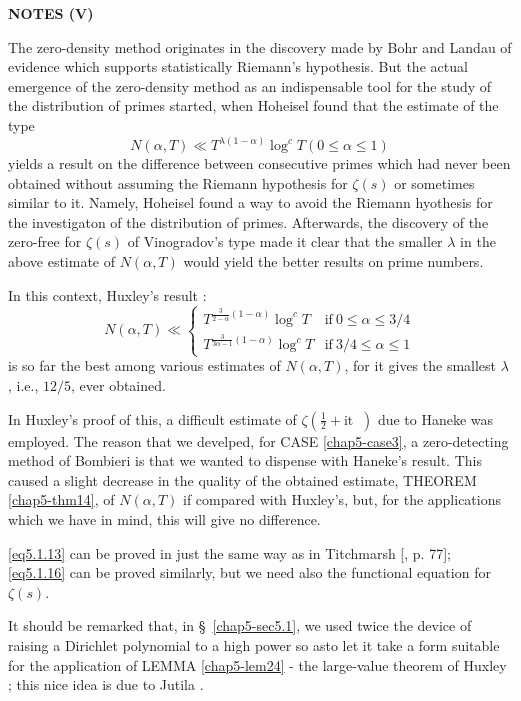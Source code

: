 \begin{center} 
\bf{NOTES (V)}
\end{center}   

  The zero-density method originates in the discovery made by Bohr and
  Landau \cite{key3} of evidence which supports statistically Riemann's
  hypothesis. But the actual emergence of the zero-density method as
  an indispensable tool for the study of the distribution of primes
  started, when Hoheisel \cite{key23} found that the estimate of the type 
  $$
  N(\alpha,  T) \ll T^{\lambda (1 - \alpha)} \log^c T (0 \leq \alpha \leq 1)
  $$
 yields a result on the difference between consecutive primes which
 had never been obtained without assuming the Riemann hypothesis for
 $\zeta (s)$ or sometimes similar to it. Namely, Hoheisel found a way
 to avoid the Riemann hyothesis for the investigaton of the
 distribution of primes. Afterwards, the discovery of the
 zero-free\pageoriginale 
 for $\zeta(s)$ of Vinogradov's type made it clear that the smaller
 $\lambda$ in the above estimate of $N(\alpha, T)$ would yield the
 better results on prime numbers. 
  
  In this context, Huxley's result \cite{key25}:
 $$
  N(\alpha, T) \ll
  \begin{cases}
    T^{\frac{3}{2- \alpha}(1-\alpha)} \log^c T & \text{if}~ 0 \leq
    \alpha \leq 3/4\\ 
    T^{\frac{3}{3 \alpha -1} (1-\alpha)} \log^c T & \text{if}~ 3/4 \leq
    \alpha \leq 1  
  \end{cases}  
 $$
is so far the best among various estimates of $N (\alpha, T)$, for it
gives the smallest $\lambda$, i.e., $12/5$, ever obtained. 

In Huxley's proof of this, a difficult estimate of $\zeta
\left(\frac{1}{2} + \text {it }~\right)$ due to Haneke was employed.
The reason 
that we develped, for CASE \ref{chap5-case3}, a zero-detecting method
of Bombieri \cite{key5} is that we wanted to dispense with Haneke's
result. This caused 
a slight decrease in the quality of the obtained estimate,  THEOREM
\ref{chap5-thm14}, of $N(\alpha, T)$ if compared with Huxley's, but, for the
applications which we have in mind, this will give no difference. 


\eqref{eq5.1.13} can be proved in just the same way as in Titchmarsh
      [\cite{key79}, p. 77]; \eqref{eq5.1.16} can be proved similarly,
      but we need also the functional equation for $\zeta (s)$. 

It should be remarked that, in \S~\ref{chap5-sec5.1}, we used twice
the device of 
raising a Dirichlet polynomial to a high power so  as\pageoriginale to
let it take a 
form suitable for the application of LEMMA \ref{chap5-lem24} - the
large-value theorem of Huxley \cite{key25}; this nice idea is due to
Jutila \cite{key37}.  

